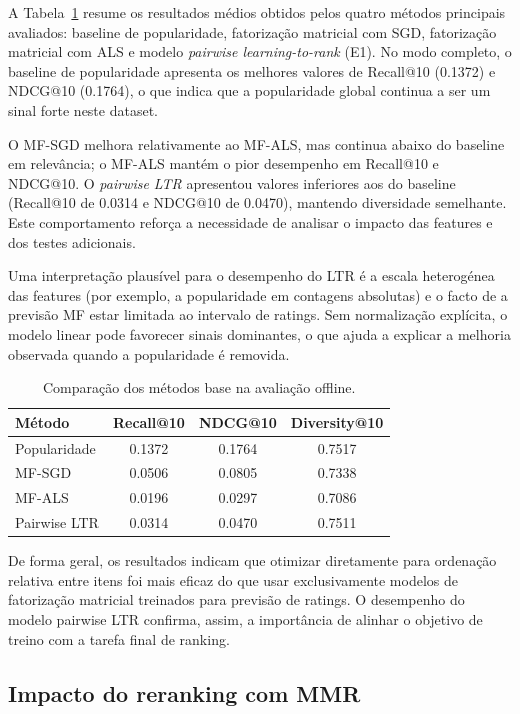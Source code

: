 \documentclass[10pt]{article}
\begin{document}
A Tabela~\ref{tab:main-results} resume os resultados médios obtidos pelos quatro métodos principais avaliados: baseline de popularidade, fatorização matricial com SGD, fatorização matricial com ALS e modelo \textit{pairwise learning-to-rank} (E1). No modo completo, o baseline de popularidade apresenta os melhores valores de Recall@10 (0.1372) e NDCG@10 (0.1764), o que indica que a popularidade global continua a ser um sinal forte neste dataset.

O MF-SGD melhora relativamente ao MF-ALS, mas continua abaixo do baseline em relevância; o MF-ALS mantém o pior desempenho em Recall@10 e NDCG@10. O \textit{pairwise LTR} apresentou valores inferiores aos do baseline (Recall@10 de 0.0314 e NDCG@10 de 0.0470), mantendo diversidade semelhante. Este comportamento reforça a necessidade de analisar o impacto das features e dos testes adicionais.

Uma interpretação plausível para o desempenho do LTR é a escala heterogénea das features (por exemplo, a popularidade em contagens absolutas) e o facto de a previsão MF estar limitada ao intervalo de ratings. Sem normalização explícita, o modelo linear pode favorecer sinais dominantes, o que ajuda a explicar a melhoria observada quando a popularidade é removida.


\begin{table}[H]
\centering
\caption{Comparação dos métodos base na avaliação offline.}
\label{tab:main-results}
\begin{tabular}{lccc}
\toprule
\textbf{Método} & \textbf{Recall@10} & \textbf{NDCG@10} & \textbf{Diversity@10} \\
\midrule
Popularidade & 0.1372 & 0.1764 & 0.7517 \\
MF-SGD & 0.0506 & 0.0805 & 0.7338 \\
MF-ALS & 0.0196 & 0.0297 & 0.7086 \\
Pairwise LTR & 0.0314 & 0.0470 & 0.7511 \\
\bottomrule
\end{tabular}
\end{table}

De forma geral, os resultados indicam que otimizar diretamente para ordenação relativa entre itens foi mais eficaz do que usar exclusivamente modelos de fatorização matricial treinados para previsão de ratings. O desempenho do modelo pairwise LTR confirma, assim, a importância de alinhar o objetivo de treino com a tarefa final de ranking. 

\subsection{Impacto do reranking com MMR}
\end{document}
